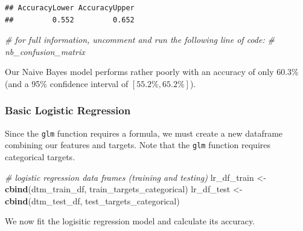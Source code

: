 \documentclass[12pt]{article}
\newenvironment{Shaded}{\begin{snugshade}}{\end{snugshade}}
\newcommand{\CommentTok}[1]{\textcolor[rgb]{0.56,0.35,0.01}{\textit{#1}}}
\newcommand{\KeywordTok}[1]{\textcolor[rgb]{0.13,0.29,0.53}{\textbf{#1}}}
\newcommand{\NormalTok}[1]{#1}
\newcommand{\StringTok}[1]{\textcolor[rgb]{0.31,0.60,0.02}{#1}}
\begin{document}
\begin{verbatim}
## AccuracyLower AccuracyUpper 
##         0.552         0.652
\end{verbatim}

\begin{Shaded}
\begin{Highlighting}[]
\CommentTok{# for full information, uncomment and run the following line of code:}
\CommentTok{# nb_confusion_matrix}
\end{Highlighting}
\end{Shaded}

Our Naive Bayes model performs rather poorly with an accuracy of only
\(60.3\%\) (and a 95\% confidence interval of \([55.2\%, 65.2\%]\)).

\hypertarget{basic-logistic-regression}{%
\subsubsection{Basic Logistic
Regression}\label{basic-logistic-regression}}

Since the \texttt{glm} function requires a formula, we must create a new
dataframe combining our features and targets. Note that the \texttt{glm}
function requires categorical targets.

\begin{Shaded}
\begin{Highlighting}[]
\CommentTok{# logistic regression data frames (training and testing)}
\NormalTok{lr_df_train <-}\StringTok{ }\KeywordTok{cbind}\NormalTok{(dtm_train_df, train_targets_categorical)}
\NormalTok{lr_df_test <-}\StringTok{ }\KeywordTok{cbind}\NormalTok{(dtm_test_df, test_targets_categorical)}
\end{Highlighting}
\end{Shaded}

We now fit the logisitic regression model and calculate its accuracy.
\end{document}
